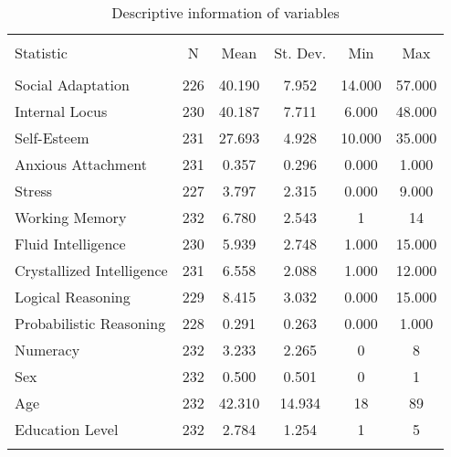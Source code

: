 
\begin{table}[!htbp] \centering 
  \caption{Descriptive information of variables} 
  \label{} 
\begin{tabular}{@{\extracolsep{5pt}}lccccc} 
\\[-1.8ex]\hline 
\hline \\[-1.8ex] 
Statistic & \multicolumn{1}{c}{N} & \multicolumn{1}{c}{Mean} & \multicolumn{1}{c}{St. Dev.} & \multicolumn{1}{c}{Min} & \multicolumn{1}{c}{Max} \\ 
\hline \\[-1.8ex] 
Social Adaptation & 226 & 40.190 & 7.952 & 14.000 & 57.000 \\ 
Internal Locus & 230 & 40.187 & 7.711 & 6.000 & 48.000 \\ 
Self-Esteem & 231 & 27.693 & 4.928 & 10.000 & 35.000 \\ 
Anxious Attachment & 231 & 0.357 & 0.296 & 0.000 & 1.000 \\ 
Stress & 227 & 3.797 & 2.315 & 0.000 & 9.000 \\ 
Working Memory & 232 & 6.780 & 2.543 & 1 & 14 \\ 
Fluid Intelligence & 230 & 5.939 & 2.748 & 1.000 & 15.000 \\ 
Crystallized Intelligence & 231 & 6.558 & 2.088 & 1.000 & 12.000 \\ 
Logical Reasoning & 229 & 8.415 & 3.032 & 0.000 & 15.000 \\ 
Probabilistic Reasoning & 228 & 0.291 & 0.263 & 0.000 & 1.000 \\ 
Numeracy & 232 & 3.233 & 2.265 & 0 & 8 \\ 
Sex & 232 & 0.500 & 0.501 & 0 & 1 \\ 
Age & 232 & 42.310 & 14.934 & 18 & 89 \\ 
Education Level & 232 & 2.784 & 1.254 & 1 & 5 \\ 
\hline \\[-1.8ex] 
\end{tabular} 
\end{table} 
